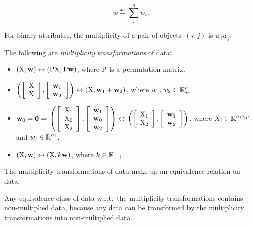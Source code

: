 \documentclass[10pt,a4paper]{article}
\theoremstyle{plain} \newtheorem{Lem}{Lemma}
\begin{document}
$$ w \eqdef \sum_i^n w_i. $$

For binary attributes, the multiplicity of a pair of objects~$(i,j)$ is $w_i w_j$.
\comm{}

The following are {\em multiplicity transformations} of data:
\begin{itemize}
\item $(\mathrm X, \mathbf w) \leftrightarrow (\mathrm P \mathrm X, \mathrm P \mathbf w)$, where $\mathrm P$ is a permutation matrix.
\item $\left(\left[ \begin{array}{c} \mathrm X \\ \mathrm X \end{array} \right], \left[ \begin{array}{c} \mathbf w_1 \\ \mathbf w_2 \end{array} \right] \right)
        \leftrightarrow (\mathrm X, \mathbf w_1 + \mathbf w_2)$,
  where $w_1, w_2 \in \mathbb R_+^n$.
\item $\mathbf w_0 = \mathbf 0 \Rightarrow
        \left(\left[ \begin{array}{c} \mathrm X_1 \\ \mathrm X_0 \\ \mathrm X_2 \end{array} \right], \left[ \begin{array}{l} \mathbf w_1 \\ \mathbf w_0 \\ \mathbf w_2 \end{array} \right] \right)
          \leftrightarrow \left(\left[ \begin{array}{c} \mathrm X_1 \\ \mathrm X_2 \end{array} \right], \left[ \begin{array}{c} \mathbf w_1 \\ \mathbf w_2 \end{array} \right] \right)$,
  where $X_i \in \mathbb R^{n_i \times p}$ and $w_i \in \mathbb R_+^{n_i}$.
\item $(\mathrm X, \mathbf w) \leftrightarrow (\mathrm X, k \mathbf w)$, where $k \in \mathbb R_{++}$.
\end{itemize}

The multiplicity transformations of data make up an equivalence relation on data.

Any equivalence class of data w.r.t.~the multiplicity transformations contains non-multiplied data,
because any data can be transformed by the multiplicity transformations into non-multiplied data.
\end{document}

